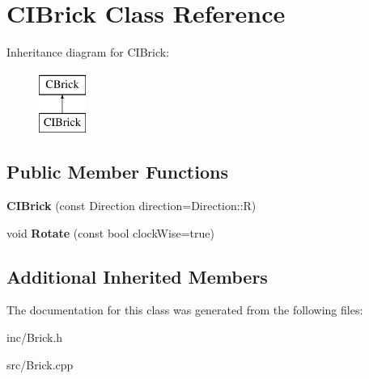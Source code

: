 \hypertarget{classCIBrick}{\section{C\-I\-Brick Class Reference}
\label{classCIBrick}
}
Inheritance diagram for C\-I\-Brick\-:\begin{figure}[H]
\begin{center}
\leavevmode
\includegraphics[height=2.000000cm]{classCIBrick}
\end{center}
\end{figure}
\subsection*{Public Member Functions}
\begin{DoxyCompactItemize}
\item 
\hypertarget{classCIBrick_a93ce36599370a04c1406f2474de28bff}{{\bfseries C\-I\-Brick} (const Direction direction=Direction\-::\-R)}\label{classCIBrick_a93ce36599370a04c1406f2474de28bff}

\item 
\hypertarget{classCIBrick_aa251c34a18be5c8433c35f1b5a99c669}{void {\bfseries Rotate} (const bool clock\-Wise=true)}\label{classCIBrick_aa251c34a18be5c8433c35f1b5a99c669}

\end{DoxyCompactItemize}
\subsection*{Additional Inherited Members}


The documentation for this class was generated from the following files\-:\begin{DoxyCompactItemize}
\item 
inc/Brick.\-h\item 
src/Brick.\-cpp\end{DoxyCompactItemize}

